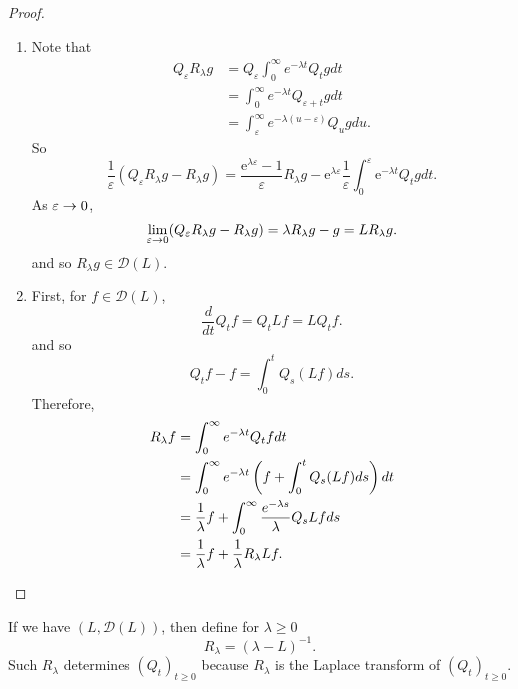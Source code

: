 \begin{proof}
    \begin{enumerate}[label=(\arabic*)]
        \item Note that
        \begin{align*}
            Q_\varepsilon R_\lambda g &= Q_\varepsilon \int_0^\infty e^{-\lambda t}Q_t g dt\\
            &=\int_0^\infty e^{-\lambda t}Q_{\varepsilon+t} g dt \\
            &= \int_\varepsilon^\infty e^{-\lambda (u -\varepsilon)} Q_u g du.
        \end{align*}
        So
        \begin{equation*}
            \frac{1}{\varepsilon}(Q_\varepsilon R_\lambda g - R_\lambda g) = \frac{\mathrm{e}^{\lambda \varepsilon}-1}{\varepsilon} R_\lambda g-\mathrm{e}^{\lambda \varepsilon} \frac{1}{\varepsilon} \int_0^\varepsilon \mathrm{e}^{-\lambda t} Q_t g d t.
        \end{equation*}
        As $\varepsilon \rightarrow 0$,
        \begin{equation*}
            \lim_{\varepsilon \rightarrow 0}(Q_\varepsilon R_\lambda g - R_\lambda g) = \lambda R_\lambda g - g = LR_\lambda g.
        \end{equation*}
        and so $R_\lambda g \in \mathcal{D}(L)$.

        \item First, for $f \in \mathcal{D}(L)$,
        \begin{equation*}
            \frac{d}{dt}Q_tf = Q_tLf = LQ_tf.
        \end{equation*}
        and so
        \begin{equation*}
            Q_t f - f = \int_0^t Q_s(Lf)ds.
        \end{equation*}
        Therefore,
        \begin{align*}
            R_\lambda f &= \int_0^\infty e^{-\lambda t}Q_t f dt \\
            &= \int_0^\infty e^{-\lambda t}\left(f+\int_0^t Q_s(Lf)ds\right) dt \\
            &= \frac{1}{\lambda}f + \int_0^\infty \frac{e^{-\lambda s}}{\lambda} Q_sLfds \\
            &= \frac{1}{\lambda}f + \frac{1}{\lambda}R_\lambda Lf. \qedhere
        \end{align*}
    \end{enumerate}
\end{proof}
\begin{rmk}
    If we have $(L,\mathcal{D}(L))$, then define for $\lambda \geq 0$
    \begin{equation*}
        R_\lambda = (\lambda -L)^{-1}.
    \end{equation*}
    Such $R_\lambda$ determines $(Q_t)_{t \geq 0}$ because $R_\lambda$ is the Laplace transform of $(Q_t)_{t \geq 0}$.
\end{rmk}

